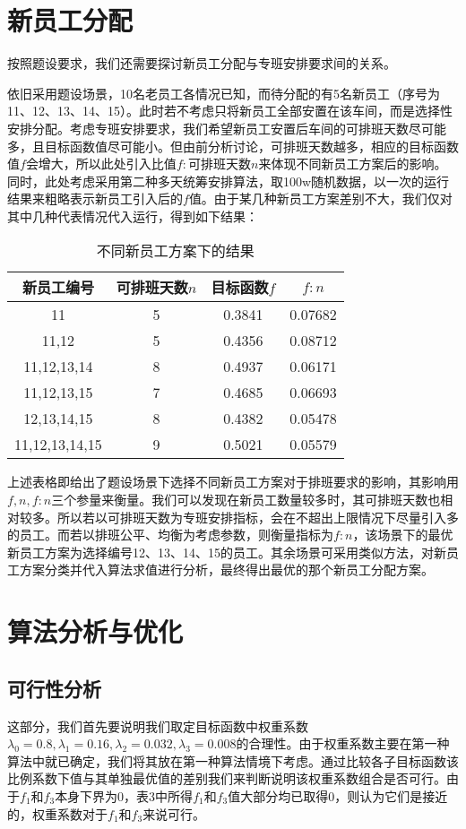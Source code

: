 \documentclass{article}
\begin{document}
	\section{新员工分配}
	按照题设要求，我们还需要探讨新员工分配与专班安排要求间的关系。
	
	依旧采用题设场景，10名老员工各情况已知，而待分配的有5名新员工（序号为11、12、13、14、15）。此时若不考虑只将新员工全部安置在该车间，而是选择性安排分配。考虑专班安排要求，我们希望新员工安置后车间的可排班天数尽可能多，且目标函数值尽可能小。但由前分析讨论，可排班天数越多，相应的目标函数值$f$会增大，所以此处引入比值$f:$可排班天数$n$来体现不同新员工方案后的影响。同时，此处考虑采用第二种多天统筹安排算法，取100w随机数据，以一次的运行结果来粗略表示新员工引入后的$f$值。由于某几种新员工方案差别不大，我们仅对其中几种代表情况代入运行，得到如下结果：

	\begin{table}[h]
		\centering
		\caption{不同新员工方案下的结果}
		\begin{tabular}{|c|c|c|c|}
			\hline
			新员工编号 & 可排班天数$n$          & 目标函数$f$  & $f:n$    \\
			\hline
			11  & 5  & 0.3841 &  0.07682\\
			11,12  & 5   & 0.4356 & 0.08712 \\
			11,12,13,14  & 8   & 0.4937 & 0.06171 \\
			11,12,13,15  &7 & 0.4685 & 0.06693 \\
			12,13,14,15  & 8       & 0.4382 & 0.05478 \\
			11,12,13,14,15  & 9      & 0.5021 & 0.05579 \\
			\hline
		\end{tabular}
	\end{table}

    上述表格即给出了题设场景下选择不同新员工方案对于排班要求的影响，其影响用$f,n,f:n$三个参量来衡量。我们可以发现在新员工数量较多时，其可排班天数也相对较多。所以若以可排班天数为专班安排指标，会在不超出上限情况下尽量引入多的员工。而若以排班公平、均衡为考虑参数，则衡量指标为$f:n$，该场景下的最优新员工方案为选择编号12、13、14、15的员工。其余场景可采用类似方法，对新员工方案分类并代入算法求值进行分析，最终得出最优的那个新员工分配方案。
    
    \newpage
	\section{算法分析与优化}
	\subsection{可行性分析}
	这部分，我们首先要说明我们取定目标函数中权重系数$\lambda_{0}=0.8,\lambda_{1}=0.16,\lambda_{2}=0.032,\lambda_{3}=0.008$的合理性。由于权重系数主要在第一种算法中就已确定，我们将其放在第一种算法情境下考虑。通过比较各子目标函数该比例系数下值与其单独最优值的差别我们来判断说明该权重系数组合是否可行。由于$f_1$和$f_3$本身下界为0，表3中所得$f_1$和$f_3$值大部分均已取得0，则认为它们是接近的，权重系数对于$f_1$和$f_3$来说可行。
	
\end{document}
